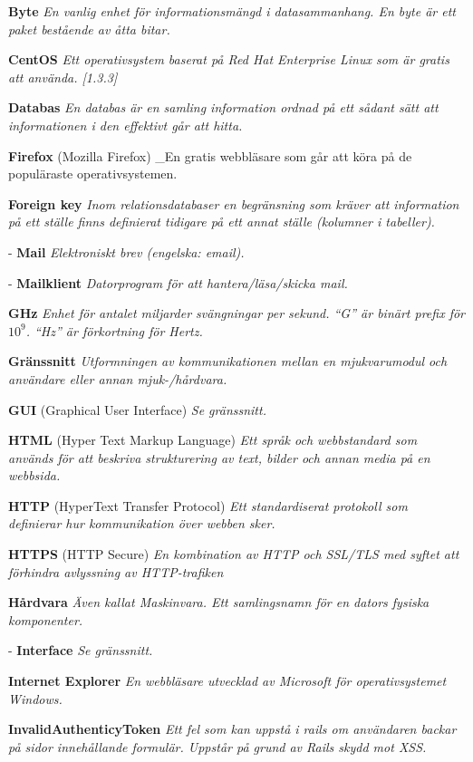 \documentclass[a4paper, twoside, 11pt, titlepage]{article}
\begin{document}
\textbf{Byte} \emph{En vanlig enhet för informationsmängd i datasammanhang. En byte är ett paket bestående av åtta bitar.}

\textbf{CentOS} \emph{Ett operativsystem baserat på Red Hat Enterprise Linux som är gratis att använda. [1.3.3]}

\textbf{Databas} \emph{En databas är en samling information ordnad på ett sådant sätt att informationen i den effektivt går att hitta.}

\textbf{Firefox} (Mozilla Firefox) \_En gratis webbläsare som går att köra på de populäraste operativsystemen.

\textbf{Foreign key} \emph{Inom relationsdatabaser en begränsning som kräver att information på ett ställe finns definierat tidigare på ett annat ställe (kolumner i tabeller).}

- \textbf{Mail} \emph{Elektroniskt brev (engelska: email).}

- \textbf{Mailklient} \emph{Datorprogram för att hantera/läsa/skicka mail.}

\textbf{GHz} \emph{Enhet för antalet miljarder svängningar per sekund. ``G'' är binärt prefix för $10^{9}$. ``Hz'' är förkortning för Hertz.}

\textbf{Gränssnitt} \emph{Utformningen av kommunikationen mellan en mjukvarumodul och användare eller annan mjuk-/hårdvara.}

\textbf{GUI} (Graphical User Interface) \emph{Se gränssnitt.}

\textbf{HTML} (Hyper Text Markup Language) \emph{Ett språk och webbstandard som används för att beskriva strukturering av text, bilder och annan media på en webbsida.}

\textbf{HTTP} (HyperText Transfer Protocol) \emph{Ett standardiserat protokoll som definierar hur kommunikation över webben sker.}

\textbf{HTTPS} (HTTP Secure) \emph{En kombination av HTTP och SSL/TLS med syftet att förhindra avlyssning av HTTP-trafiken}

\textbf{Hårdvara} \emph{Även kallat Maskinvara. Ett samlingsnamn för en dators fysiska komponenter.}

- \textbf{Interface} \emph{Se gränssnitt.}

\textbf{Internet Explorer} \emph{En webbläsare utvecklad av Microsoft för operativsystemet Windows.}

\textbf{InvalidAuthenticyToken} \emph{Ett fel som kan uppstå i rails om användaren backar på sidor innehållande formulär. Uppstår på grund av Rails skydd mot XSS.}
\end{document}

